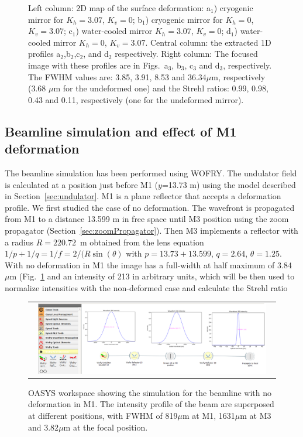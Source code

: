 \documentclass[preprint]{iucr}              %
\begin{document}
\begin{figure}
\begin{center}
\begin{tabular}{l}
   \end{tabular}
  \end{center}
   \caption
   { 
   Left column: 2D map of the surface deformation: a$_1$) cryogenic mirror for $K_h=3.07$, $K_v=0$; b$_1$) cryogenic mirror for $K_h=0$, $K_v=3.07$; c$_1$) water-cooled mirror $K_h=3.07$, $K_v=0$; d$_1$) water-cooled mirror $K_h=0$, $K_v=3.07$. Central column: the extracted 1D profiles a$_2$,b$_2$,c$_2$, and d$_2$ respectively. Right column: The focused image with these profiles are in Figs.~a$_3$, b$_3$, c$_3$ and d$_3$, respectively. 
   The FWHM values are: 3.85, 3.91, 8.53 and 36.34$\mu$m, respectively (3.68 $\mu$m for the undeformed one) and the Strehl ratios: 0.99, 0.98, 0.43 and 0.11, respectively (one for the undeformed mirror).
   }
   \end{figure} 


\subsection{Beamline simulation and effect of M1 deformation}

The beamline simulation has been performed using WOFRY. The undulator field is calculated at a position just before M1 ($y$=13.73 m) using the model described in Section~\ref{sec:undulator}. M1 is a plane reflector that accepts a deformation profile. We first studied the case of no deformation. The wavefront is propagated from M1 to a distance 13.599 m in free space until M3 position using the zoom propagator (Section~\ref{sec:zoomPropagator}). Then M3 implements a reflector with a radius $R=220.72$~m obtained from the lens equation $1/p + 1/q=1/f=2/(R \sin(\theta)$ with $p=13.73+13.599$, $q=2.64$, $\theta=1.25$\textdegree. With no deformation in M1 the image has a full-width at half maximum of 3.84 $\mu$m (Fig.~\ref{fig:nodeformation} and an intensity of 213 in arbitrary units, which will be then used to normalize intensities with the non-deformed case and calculate the Strehl ratio

\begin{figure} 
\label{fig:nodeformation} 
\begin{center}
\begin{tabular}{c} 
\includegraphics[width=0.95\textwidth]{figures/wofrynodeformation.png}

\end{tabular}
\end{center}
\caption
{ 
OASYS workspace showing the simulation for the beamline with no deformation in M1. The intensity profile of the beam are superposed at different positions, with FWHM of 819$\mu$m at M1, 1631$\mu$m at M3 and 3.82$\mu$m at the focal position.  }
\end{figure} 
\end{document}
